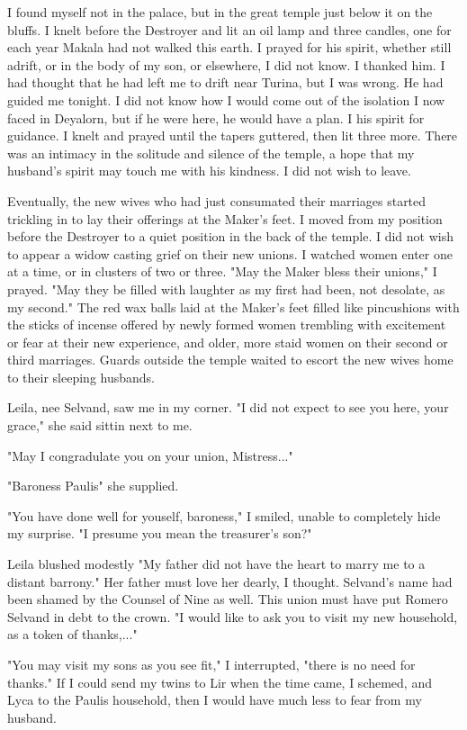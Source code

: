 \documentclass{article}
\begin{document}
I found myself not in the palace, but in the great temple just below it on the bluffs. I knelt before the Destroyer and lit an oil lamp and three candles, one for each year Makala had not walked this earth. I prayed for his spirit, whether still adrift, or in the body of my son, or elsewhere, I did not know. I thanked him. 
I had thought that he had left me to drift near Turina, but I was wrong. He had guided me tonight. I did not know how I would come out of the isolation I now faced in Deyalorn, but if he were here, he would have a plan. I his spirit for guidance. I knelt and prayed until the tapers guttered, then lit three more. There was an intimacy in the solitude and silence of the temple, a hope that my husband's spirit may touch me with his kindness. I did not wish to leave.

Eventually, the new wives who had just consumated their marriages started trickling in to lay their offerings at the Maker's feet. I moved from my position before the Destroyer to a quiet position in the back of the temple. I did not wish to appear a widow casting grief on their new unions. I watched women enter one at a time, or in clusters of two or three. "May the Maker bless their unions," I prayed. "May they be filled with laughter as my first had been, not desolate, as my second." The red wax balls laid at the Maker's feet filled like pincushions with the sticks of incense offered by newly formed women trembling with excitement or fear at their new experience, and older, more staid women on their second or third marriages. Guards outside the temple waited to escort the new wives home to their sleeping husbands. 

Leila, nee Selvand, saw me in my corner. "I did not expect to see you here, your grace," she said sittin next to me.

"May I congradulate you on your union, Mistress..." 

"Baroness Paulis" she supplied.

"You have done well for youself, baroness," I smiled, unable to completely hide my surprise. "I presume you mean the treasurer's son?" 

Leila blushed modestly "My father did not have the heart to marry me to a distant barrony." Her father must love her dearly, I thought. Selvand's name had been shamed by the Counsel of Nine as well. This union must have put Romero Selvand in debt to the crown. "I would like to ask you to visit my new household, as a token of thanks,..."

"You may visit my sons as you see fit," I interrupted, "there is no need for thanks." If I could send my twins to Lir when the time came, I schemed, and Lyca to the Paulis household, then I would have much less to fear from my husband.
\end{document}
